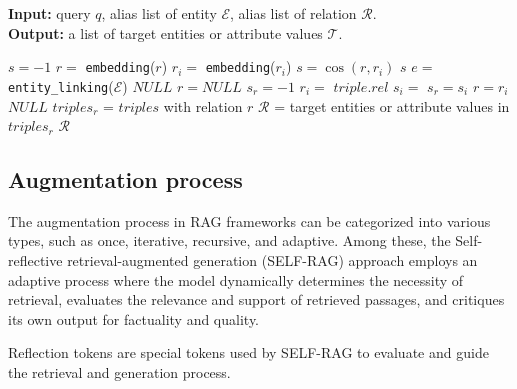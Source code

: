 \begin{algorithm}
\caption{\texttt{find\_entity\_or\_value}} \label{alg:cap}
\textbf{Input:} query $q$, alias list of entity $\mathcal{E}$, alias list of relation $\mathcal{R}$. \\
\textbf{Output:} a list of target entities or attribute values $\mathcal{T}$.
\begin{algorithmic}[1]
    \State $s = -1$
    \State $r =$ \texttt{embedding}($r$)
        \State $r_i =$ \texttt{embedding}($r_i$)
            \State $s = \cos(r, r_i)$
        \EndIf
    \EndFor
    \State \Return $s$
\EndFunction
\State $e =$ \texttt{entity\_linking}($\mathcal{E}$)
    \State \Return $NULL$
\EndIf
\State $r = NULL$
\State $s_r = -1$
    \State $r_i = $  $triple.rel$
    \State $s_i =$ 
        \State $s_r = s_i$
        \State $r = r_i$
    \EndIf
\EndFor
{}
    \State \Return $NULL$
\EndIf
\State $triples_r$ = $triples$ with relation $r$
\State $\mathcal{R}$ = target entities or attribute values in $triples_r$
\State \Return $\mathcal{R}$ %
\end{algorithmic}
\end{algorithm}

\subsection{Augmentation process}

The augmentation process in RAG frameworks can be categorized into various types, such as once, iterative, recursive, and adaptive. Among these, the Self-reflective retrieval-augmented generation (SELF-RAG) \cite{asai2023selfrag} approach employs an adaptive process where the model dynamically determines the necessity of retrieval, evaluates the relevance and support of retrieved passages, and critiques its own output for factuality and quality. 

Reflection tokens are special tokens used by SELF-RAG to evaluate and guide the retrieval and generation process.

